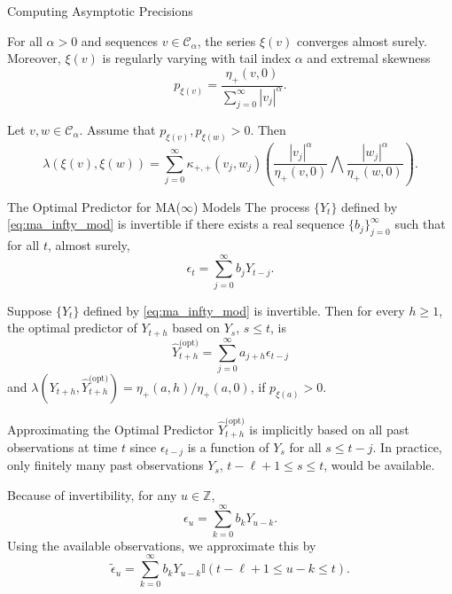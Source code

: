 \documentclass{beamer}
\def\I{\mathbb I}
\def\Z{{\mathbb Z}}
\def\seqSet{\mathcal{C}_{\alpha}}
\def\series{\xi}
\newcommand{\mmultiplier}[4]{\kappa_{#1, #2}(#3, #4)}
\newcommand{\normConst}[3]{\eta_{#1}({#2}, {#3})}
\newcommand{\pred}[1]{\hat{Y}_{t + h}^{\text{(#1)}}}
\begin{document}
\begin{frame}{Computing Asymptotic Precisions}
    \begin{lemma}
        For all $\alpha > 0$ and sequences $v \in \seqSet$, the series $\series(v)$ converges almost surely. Moreover, $\series(v)$ is regularly varying with tail index $\alpha$ and extremal skewness
        \[
        p_{\series(v)} = \frac{\normConst{+}{v}{0}}{\sum_{j = 0}^{\infty} |v_j|^{\alpha}}.
        \]
    \end{lemma}
    \begin{lemma}
        Let $v, w \in \seqSet$. Assume that $p_{\series(v)}, p_{\series(w)} > 0$. Then
        \[
        \lambda\left(\series(v), \series(w)\right)
        = \sum_{j = 0}^{\infty} \mmultiplier{+}{+}{v_j}{w_j}\left(\frac{|v_j|^{\alpha}}{\normConst{+}{v}{0}} \bigwedge \frac{|w_j|^{\alpha}}{\normConst{+}{w}{0}}\right).
        \]
    \end{lemma}
\end{frame}

\begin{frame}{The Optimal Predictor for MA($\infty$) Models}
    The process $\{Y_t\}$ defined by \eqref{eq:ma_infty_mod} is invertible if there exists a real sequence $\{b_j\}_{j = 0}^{\infty}$ such that for all $t$, almost surely,
    \[
    \epsilon_t = \sum_{j = 0}^{\infty} b_j Y_{t - j}.
    \]

    \begin{theorem}
        Suppose $\{Y_t\}$ defined by \eqref{eq:ma_infty_mod} is invertible. Then for every $h \ge 1$, the optimal predictor of $Y_{t + h}$ based on $Y_s$, $s \le t$, is
        \[
        \pred{opt} = \sum_{j = 0}^{\infty} a_{j + h}\epsilon_{t - j}
        \]
        and $\lambda(Y_{t + h}, \pred{opt}) = \normConst{+}{a}{h} / \normConst{+}{a}{0}$, if $p_{\series(a)} > 0$.
    \end{theorem}
\end{frame}

\begin{frame}{Approximating the Optimal Predictor}
    $\pred{opt}$ is implicitly based on all past observations at time $t$ since $\epsilon_{t - j}$ is a function of $Y_s$ for all $s \le t - j$. In practice, only finitely many past observations $Y_s$, $t - \ell + 1 \le s \le t$, would be available.

    \medskip
    
    Because of invertibility, for any $u \in \Z$,
    \[
    \epsilon_u = \sum_{k = 0}^{\infty} b_k Y_{u - k}.
    \]
    Using the available observations, we approximate this by
    \[
    \tilde{\epsilon}_u = \sum_{k = 0}^{\infty} b_k Y_{u - k}\I(t - \ell + 1 \le u - k \le t).
    \]
\end{frame}
\end{document}
